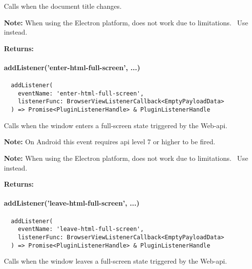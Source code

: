 Calls  when the document title changes.

\textbf{Note:} When using the Electron platform,  does not work due to limitations.~\cite{capacitor-electron}
Use  instead.

\textbf{Returns:} 



\paragraph{addListener('enter-html-full-screen', ...)}

\begin{verbatim}
  addListener(
    eventName: 'enter-html-full-screen',
    listenerFunc: BrowserViewListenerCallback<EmptyPayloadData>
  ) => Promise<PluginListenerHandle> & PluginListenerHandle
\end{verbatim}

Calls  when the window enters a full-screen state triggered by the Web-\acs{api}.

\textbf{Note:} On Android this event requires \ac{api} level 7 or higher to be fired.~\cite{android:api}

\textbf{Note:} When using the Electron platform,  does not work due to limitations.~\cite{capacitor-electron}
Use  instead.

\textbf{Returns:} 


\newpage

\paragraph{addListener('leave-html-full-screen', ...)}

\begin{verbatim}
  addListener(
    eventName: 'leave-html-full-screen',
    listenerFunc: BrowserViewListenerCallback<EmptyPayloadData>
  ) => Promise<PluginListenerHandle> & PluginListenerHandle
\end{verbatim}

Calls  when the window leaves a full-screen state triggered by the Web-\acs{api}.

